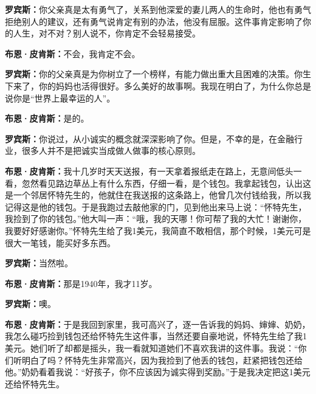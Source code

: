 \begin{BookQuote}
\textbf{罗宾斯：}你父亲真是太有勇气了，关系到他深爱的妻儿两人的生命时，他也有勇气拒绝别人的建议，还有勇气说肯定有别的办法，他没有屈服。这件事肯定影响了你的人生，对不对？别人说不，你肯定不会轻易接受。
\end{BookQuote}

\begin{BookQuote}
\textbf{布恩·皮肯斯：}不会，我肯定不会。
\end{BookQuote}

\begin{BookQuote}
\textbf{罗宾斯：}你的父亲真是为你树立了一个榜样，有能力做出重大且困难的决策。你生下来了，你的妈妈也活得很好。多么美好的故事啊。我现在明白了，为什么你总是说你是“世界上最幸运的人”。
\end{BookQuote}

\begin{BookQuote}
\textbf{布恩·皮肯斯：}是的。
\end{BookQuote}

\begin{BookQuote}
\textbf{罗宾斯：}你说过，从小诚实的概念就深深影响了你。但是，不幸的是，在金融行业，很多人并不是把诚实当成做人做事的核心原则。
\end{BookQuote}

\begin{BookQuote}
\textbf{布恩·皮肯斯：}我十几岁时天天送报，有一天拿着报纸走在路上，无意间低头一看，忽然看见路边草丛上有什么东西，仔细一看，是个钱包。我拿起钱包，认出这是一个邻居怀特先生的，他就住在我送报的这条路上，他曾几次付钱给我，所以我记得这是他的钱包。于是我跑过去敲他家的门，见到他出来马上说：“怀特先生，我捡到了你的钱包。”他大叫一声：“哦，我的天哪！你可帮了我的大忙！谢谢你，我要好好感谢你。”怀特先生给了我1美元，我简直不敢相信，那个时候，1美元可是很大一笔钱，能买好多东西。
\end{BookQuote}

\begin{BookQuote}
\textbf{罗宾斯：}当然啦。
\end{BookQuote}

\begin{BookQuote}
\textbf{布恩·皮肯斯：}那是1940年，我才11岁。
\end{BookQuote}

\begin{BookQuote}
\textbf{罗宾斯：}噢。
\end{BookQuote}

\begin{BookQuote}
\textbf{布恩·皮肯斯：}于是我回到家里，我可高兴了，逐一告诉我的妈妈、婶婶、奶奶，我怎么碰巧捡到钱包还给怀特先生这件事，当然还要自豪地说，怀特先生给了我1美元。她们听了却都是摇头，我一看就知道她们不喜欢我讲的这件事。我说：“你们听明白了吗？怀特先生非常高兴，因为我捡到了他丢的钱包，赶紧把钱包还给他。”奶奶看着我说：“好孩子，你不应该因为诚实得到奖励。”于是我决定把这1美元还给怀特先生。
\end{BookQuote}

